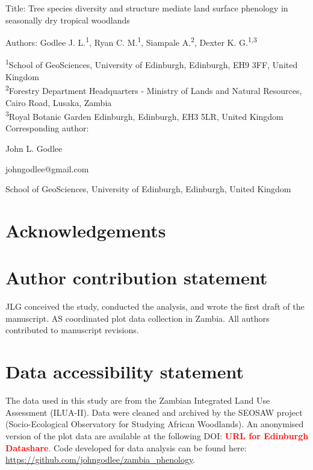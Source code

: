 \documentclass[11pt,a4paper]{article}
\newcommand{\todo}[1]{\textcolor{red}{\textbf{#1}}}   %
\providecommand{\DIFaddbegin}{} %
\providecommand{\DIFaddend}{} %
\providecommand{\DIFdelbegin}{} %
\providecommand{\DIFdelend}{} %
\newcommand{\DIFscaledelfig}{0.5}
\newlength{\DIFdelgraphicswidth} %
\newlength{\DIFdelgraphicsheight} %
\newcommand{\DIFaddincludegraphics}[2][]{{\color{blue}\fbox{\DIFOincludegraphics[#1]{#2}}}} %
\newcommand{\DIFdelincludegraphics}[2][]{%
\sbox{\DIFdelgraphicsbox}{\DIFOincludegraphics[#1]{#2}}%
\settoboxwidth{\DIFdelgraphicswidth}{\DIFdelgraphicsbox} %
\settoboxtotalheight{\DIFdelgraphicsheight}{\DIFdelgraphicsbox} %
\scalebox{\DIFscaledelfig}{%
\parbox[b]{\DIFdelgraphicswidth}{\usebox{\DIFdelgraphicsbox}\\[-\baselineskip] \rule{\DIFdelgraphicswidth}{0em}}\llap{\resizebox{\DIFdelgraphicswidth}{\DIFdelgraphicsheight}{%
\setlength{\unitlength}{\DIFdelgraphicswidth}%
\begin{picture}(1,1)%
\thicklines\linethickness{2pt} %
{\color[rgb]{1,0,0}\put(0,0){\framebox(1,1){}}}%
{\color[rgb]{1,0,0}\put(0,0){\line( 1,1){1}}}%
{\color[rgb]{1,0,0}\put(0,1){\line(1,-1){1}}}%
\end{picture}%
}\hspace*{3pt}}} %
} %
\DeclareRobustCommand{\DIFaddbegin}{\DIFOaddbegin \let\includegraphics\DIFaddincludegraphics} %
\DeclareRobustCommand{\DIFaddend}{\DIFOaddend \let\includegraphics\DIFOincludegraphics} %
\DeclareRobustCommand{\DIFdelbegin}{\DIFOdelbegin \let\includegraphics\DIFdelincludegraphics} %
\DeclareRobustCommand{\DIFdelend}{\DIFOaddend \let\includegraphics\DIFOincludegraphics} %
\begin{document}
{\DIFdelbegin %
\DIFdelend \DIFaddbegin \Large{Title: Tree species diversity and structure mediate land surface phenology in seasonally dry tropical woodlands}\DIFaddend }

Authors: Godlee J. L.\textsuperscript{1}, Ryan C. M.\textsuperscript{1}, Siampale A.\textsuperscript{2}, Dexter K. G.\textsuperscript{1,3}

\textsuperscript{1}School of GeoSciences, University of Edinburgh, Edinburgh, EH9 3FF, United Kingdom \\
\textsuperscript{2}Forestry Department Headquarters - Ministry of Lands and Natural Resources, Cairo Road, Lusaka, Zambia \\
\textsuperscript{3}Royal Botanic Garden Edinburgh, Edinburgh, EH3 5LR, United Kingdom \\

\vspace{1em}
Corresponding author:

John L. Godlee

johngodlee@gmail.com

School of GeoSciences, University of Edinburgh, Edinburgh, United Kingdom

\section*{Acknowledgements}

\section*{Author contribution statement}

JLG conceived the study, conducted the analysis, and wrote the first draft of the manuscript. AS coordinated plot data collection in Zambia. All authors contributed to manuscript revisions. 

\section*{Data accessibility statement}

The data used in this study are from the Zambian Integrated Land Use Assessment (ILUA-II). Data were cleaned and archived by the SEOSAW project (Socio-Ecological Observatory for Studying African Woodlands). An anonymised version of the plot data are available at the following DOI: \todo{URL for Edinburgh Datashare}. Code developed for data analysis can be found here: \url{https://github.com/johngodlee/zambia_phenology}.
\end{document}
